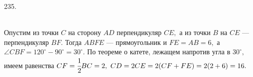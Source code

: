 235. \begin{figure}[ht!]
\end{figure}\\
Опустим из точки $C$ на сторону $AD$ перпендикуляр $CE,$ а из точки $B$ на $CE$ --- перпендикуляр $BF.$ Тогда $ABFE$ --- прямоугольник и $FE=AB=6,$ а $\angle CBF=  120^\circ-90^\circ=30^\circ.$ По теореме о катете, лежащем напротив угла в $30^\circ,$ имеем равенства $CF=\cfrac{1}{2}BC=2,\ CD=2CE=2(CF+FE)=2(2+6)=16.$\\
